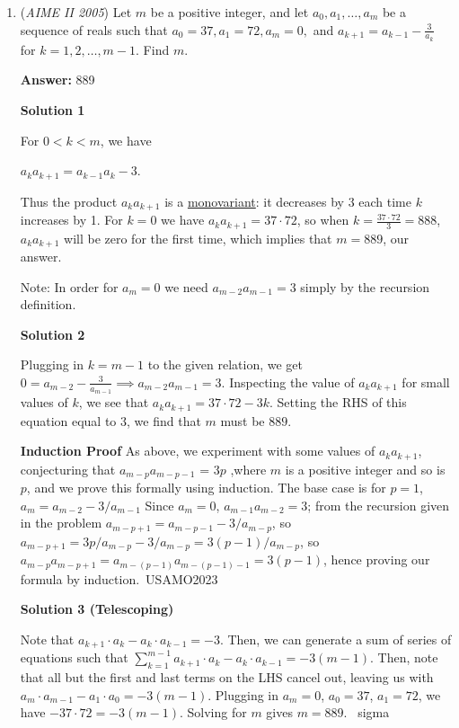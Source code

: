 \begin{enumerate}
	\item (\textit{AIME II 2005}) Let $m$ be a positive integer, and let $a_0, a_1,\ldots,a_m$ be a sequence of reals such that $a_0 = 37, a_1 = 72, a_m = 0,$ and $a_{k+1} = a_{k-1} - \frac 3{a_k}$ for $k = 1,2,\ldots, m-1.$ Find $m.$

 \textbf{Answer: }889



\textbf{Solution 1}

For $0 < k < m$, we have

 $a_{k}a_{k+1} = a_{k-1}a_{k} - 3$.

 

 Thus the product $a_{k}a_{k+1}$ is a \href{https://artofproblemsolving.com/wiki/index.php?title=Monovariant}{monovariant}: it decreases by 3 each time $k$ increases by 1.  For $k = 0$ we have $a_{k}a_{k+1} = 37\cdot 72$, so when $k = \frac{37 \cdot 72}{3} = 888$, $a_{k}a_{k+1}$ will be zero for the first time, which implies that $m = \boxed{889}$, our answer.

 
Note: In order for $a_{m} = 0$ we need $a_{m-2}a_{m-1}=3$ simply by the recursion definition.

 



\textbf{Solution 2}

Plugging in $k = m-1$ to the given relation, we get $0 = a_{m-2} - \frac {3}{a_{m-1}} \implies{a_{m-2}a_{m-1} = 3}$. Inspecting the value of $a_{k}a_{k+1}$ for small values of $k$, we see that $a_{k}a_{k+1} = 37\cdot 72 - 3k$. Setting the RHS of this equation equal to $3$, we find that $m$ must be $\boxed{889}$.

 \textbf{Induction Proof} As above, we experiment with some values of $a_{k}a_{k+1}$, conjecturing that $a_{m-p}a_{m-p-1}$ = $3p$ ,where $m$ is a positive integer and so is $p$, and we prove this formally using induction. The base case is for $p = 1$, $a_{m} = a_{m-2} - 3/a_{m-1}$ Since $a_{m} = 0$, $a_{m-1}a_{m-2} = 3$; from the recursion given in the problem $a_{m-p+1} = a_{m-p-1} - 3/a_{m-p}$, so $a_{m-p+1} = 3p/a_{m-p} - 3/a_{m-p} = 3(p-1)/a_{m-p}$, so $a_{m-p}a_{m-p+1} = a_{m-(p-1)}a_{m-(p-1)-1} = 3(p-1)$, hence proving our formula by induction.~USAMO2023

 



\textbf{Solution 3 (Telescoping)}

Note that $a_{k+1}\cdot a_{k} - a_{k}\cdot a_{k-1} = - 3$. Then, we can generate a sum of series of equations such that $\sum_{k=1}^{m-1} a_{k+1}\cdot a_{k} - a_{k}\cdot a_{k-1} = - 3(m-1)$. Then, note that all but the first and last terms on the LHS cancel out, leaving us with $a_m\cdot a_{m-1} - a_1\cdot a_0 = -3(m-1)$. Plugging in $a_m=0$, $a_0=37$, $a_1=72$, we have $-37\cdot 72 = -3(m-1)$. Solving for $m$ gives $m=\boxed{889}$. ~sigma


\end{enumerate}
